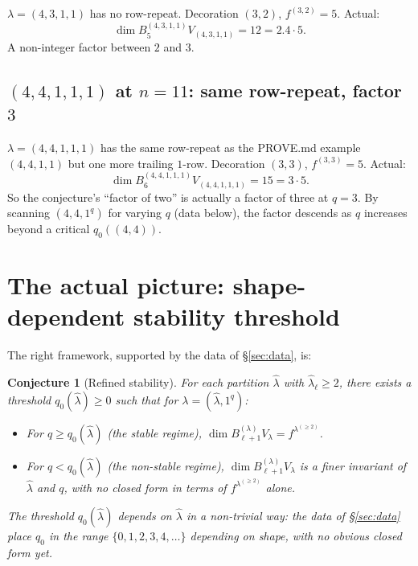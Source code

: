 \documentclass[11pt]{article}
\newtheorem{conjecture}[theorem]{Conjecture}
\theoremstyle{definition}
\begin{document}
$\lambda = (4, 3, 1, 1)$ has no row-repeat.  Decoration $(3, 2)$,
$f^{(3, 2)} = 5$.  Actual:
\[
   \dim B^{(4,3,1,1)}_5 V_{(4,3,1,1)} = 12 = 2.4 \cdot 5.
\]
A non-integer factor between $2$ and $3$.

\subsection{$(4, 4, 1, 1, 1)$ at $n = 11$: same row-repeat, factor $3$}

$\lambda = (4, 4, 1, 1, 1)$ has the same row-repeat as the
PROVE.md example $(4, 4, 1, 1)$ but one more trailing $1$-row.
Decoration $(3, 3)$, $f^{(3, 3)} = 5$.  Actual:
\[
   \dim B^{(4,4,1,1,1)}_6 V_{(4,4,1,1,1)} = 15 = 3 \cdot 5.
\]
So the conjecture's ``factor of two'' is actually a factor of three at
$q = 3$.  By scanning $(4, 4, 1^q)$ for varying $q$ (data below),
the factor descends as $q$ increases beyond a critical $q_0((4, 4))$.

\section{The actual picture: shape-dependent stability threshold}
\label{sec:picture}

The right framework, supported by the data of \S\ref{sec:data}, is:

\begin{conjecture}[Refined stability]\label{conj:refined}
For each partition $\widehat\lambda$ with $\widehat\lambda_\ell \ge 2$,
there exists a threshold $q_0(\widehat\lambda) \ge 0$ such that for
$\lambda = (\widehat\lambda, 1^q)$:
\begin{itemize}[topsep=0.3em,itemsep=0.2em]
\item For $q \ge q_0(\widehat\lambda)$ (the \emph{stable regime}),
$\dim B_{\ell + 1}^{(\lambda)} V_\lambda = f^{\lambda^{(\ge 2)}}$.
\item For $q < q_0(\widehat\lambda)$ (the \emph{non-stable regime}),
$\dim B_{\ell + 1}^{(\lambda)} V_\lambda$ is a finer invariant of
$\widehat\lambda$ and $q$, with no closed form in terms of
$f^{\lambda^{(\ge 2)}}$ alone.
\end{itemize}
The threshold $q_0(\widehat\lambda)$ depends on $\widehat\lambda$ in a
non-trivial way: the data of \S\ref{sec:data} place $q_0$ in the range
$\{0, 1, 2, 3, 4, \ldots\}$ depending on shape, with no obvious
closed form yet.
\end{conjecture}
\end{document}
